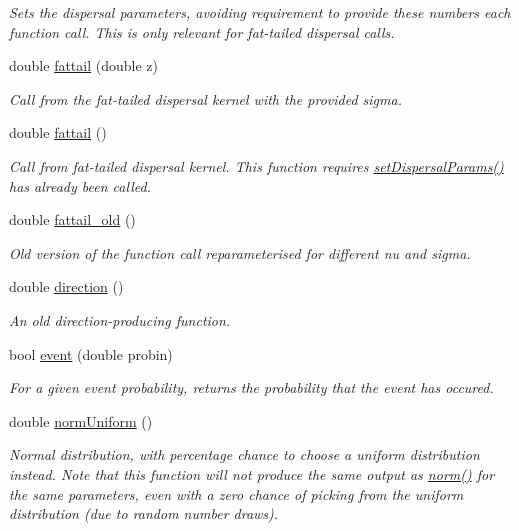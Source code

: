 \begin{DoxyCompactItemize}
\begin{DoxyCompactList}\small\item\em Sets the dispersal parameters, avoiding requirement to provide these numbers each function call. This is only relevant for fat-\/tailed dispersal calls. \end{DoxyCompactList}\item 
double \hyperlink{class_n_rrand_a464101f3def678477f9156d0bd1aab54}{fattail} (double z)
\begin{DoxyCompactList}\small\item\em Call from the fat-\/tailed dispersal kernel with the provided sigma. \end{DoxyCompactList}\item 
double \hyperlink{class_n_rrand_a3ec8aae87ae486ddfb5ad481a7972c27}{fattail} ()
\begin{DoxyCompactList}\small\item\em Call from fat-\/tailed dispersal kernel. This function requires \hyperlink{class_n_rrand_a5679f458940de730f527772ca27db5ad}{set\+Dispersal\+Params()} has already been called. \end{DoxyCompactList}\item 
double \hyperlink{class_n_rrand_aab0ec97e2c0f74cf38cc7047356cae5c}{fattail\+\_\+old} ()
\begin{DoxyCompactList}\small\item\em Old version of the function call reparameterised for different nu and sigma. \end{DoxyCompactList}\item 
double \hyperlink{class_n_rrand_aef021289f62893215204589af450bf65}{direction} ()
\begin{DoxyCompactList}\small\item\em An old direction-\/producing function. \end{DoxyCompactList}\item 
bool \hyperlink{class_n_rrand_a4a28ef1e508296a5a85b435f8005d9f7}{event} (double probin)
\begin{DoxyCompactList}\small\item\em For a given event probability, returns the probability that the event has occured. \end{DoxyCompactList}\item 
double \hyperlink{class_n_rrand_ab18277b2f873878602e82672b272c9be}{norm\+Uniform} ()
\begin{DoxyCompactList}\small\item\em Normal distribution, with percentage chance to choose a uniform distribution instead. Note that this function will not produce the same output as \hyperlink{class_n_rrand_aa57a6e9bae94c2df5a00473ba6fa900d}{norm()} for the same parameters, even with a zero chance of picking from the uniform distribution (due to random number draws). \end{DoxyCompactList}\item 

\end{DoxyCompactItemize}
